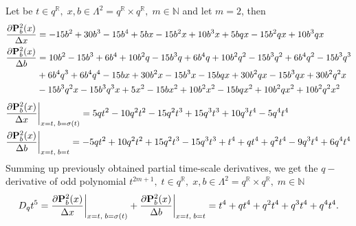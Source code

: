 \begin{examp}
    Let be $t\in q^{\mathbb{R}}, \; x,b\in \Lambda^2 = q^{\mathbb{R}} \times q^{\mathbb{R}}, \; m\in\mathbb{N}$ and let $m=2$, then
    \begin{align*}
        \frac{\partial {\mathbf{P}}\sp{2} \sb{b}(x)}{\Delta x}
        &= -15 b^2 + 30 b^3 - 15 b^4 + 5 b x - 15 b^2 x + 10 b^3 x + 5 b q x - 15 b^2 q x + 10 b^3 q x \\
        \frac{\partial {\mathbf{P}}\sp{2} \sb{b}(x)}{\Delta b}
        &= 10 b^2 - 15 b^3 + 6 b^4 + 10 b^2 q - 15 b^3 q + 6 b^4 q
        + 10 b^2 q^2 - 15 b^3 q^2 + 6 b^4 q^2 - 15 b^3 q^3 \\
        &+ 6 b^4 q^3 + 6 b^4 q^4 - 15 b x + 30 b^2 x - 15 b^3 x - 15 b q x + 30 b^2 q x
        - 15 b^3 q x + 30 b^2 q^2 x \\
        &- 15 b^3 q^2 x - 15 b^3 q^3 x + 5 x^2 - 15 b x^2 + 10 b^2 x^2 - 15 b q x^2 + 10 b^2 q x^2 + 10 b^2 q^2 x^2
    \end{align*}
    \begin{align*}
        &\frac{\partial {\mathbf{P}}\sp{2} \sb{b}(x)}{\Delta x} \bigg |_{x = t, \; b = \sigma(t)}
        = 5 q t^2 - 10 q^2 t^2 - 15 q^2 t^3 + 15 q^3 t^3 + 10 q^3 t^4 - 5 q^4 t^4 \\
        &\frac{\partial {\mathbf{P}}\sp{2} \sb{b}(x)}{\Delta b} \bigg |_{x = t, \; b = t}
        = -5 q t^2 + 10 q^2 t^2 + 15 q^2 t^3 - 15 q^3 t^3 + t^4 + q t^4 + q^2 t^4 - 9 q^3 t^4 + 6 q^4 t^4
    \end{align*}
    Summing up previously obtained partial time-scale derivatives, we get the $q-$derivative of odd polynomial
    $t^{2m+1}, \; t\in q^{\mathbb{R}}, \; x,b\in \Lambda^2 = q^{\mathbb{R}} \times q^{\mathbb{R}}, \; m\in\mathbb{N}$
    \[
        D_{q} t^{5}
        = \frac{\partial {\mathbf{P}}\sp{2} \sb{b}(x)}{\Delta x} \bigg |_{x = t, \; b = \sigma(t)}
        + \frac{\partial {\mathbf{P}}\sp{2} \sb{b}(x)}{\Delta b} \bigg |_{x = t, \; b = t}
        = t^4 + q t^4 + q^2 t^4 + q^3 t^4 + q^4 t^4.
    \]
\end{examp}